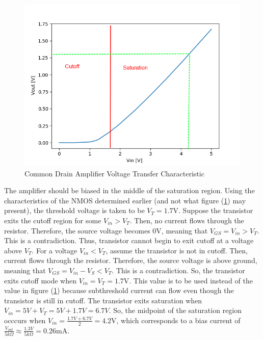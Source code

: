 \FloatBarrier

\begin{figure}[h!]
	\centering
	\includegraphics[scale=0.50]{../data/common_drain_edited.png}
	\caption{Common Drain Amplifier Voltage Transfer Characteristic}
	\label{fig:common_drain}
\end{figure}

\FloatBarrier

The amplifier should be biased in the middle of the saturation region. Using the characteristics of the NMOS determined earlier (and not what figure (\ref{fig:common_drain}) may present), the threshold voltage is taken to be $V_T = 1.7$\si{\volt}. Suppose the transistor exits the cutoff region for some $V_{in} > V_T$. Then, no current flows through the resistor. Therefore, the source voltage becomes $0$\si{\volt}, meaning that $V_{GS} = V_{in} > V_T$. This is a contradiction. Thus, transistor cannot begin to exit cutoff at a voltage above $V_T$.
For a voltage $V_{in} < V_T$, assume the transistor is not in cutoff. Then, current flows through the resistor.
Therefore, the source voltage is above ground, meaning that $V_{GS} = V_{in} - V_S < V_T$.
This is a contradiction.
So, the transistor exits cutoff mode when $V_{in} = V_T = 1.7$\si{\volt}. This value is to be used instead of the value in figure (\ref{fig:common_drain}) because subthreshold current can flow even though the transistor is still in cutoff.
The transistor exits saturation when $V_{in} = 5V + V_T = 5V + 1.7V = 6.7V$. So, the midpoint of the saturation region occcurs when $V_{in} = \frac{1.7V + 6.7V}{2} = 4.2$\si{\volt}, which corresponds to a bias current of $\frac{V_{out}}{5k\Omega} \approx \frac{1.3V}{5k\Omega} = 0.26$\si{\milli\ampere}.
